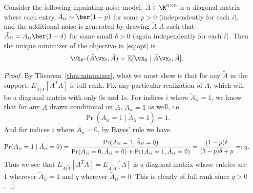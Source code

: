 \documentclass{article}
\begin{document}
\begin{corollary}\label{cor:inpainting}
    Consider the following inpainting noise model: $A \in \R^{n \times n}$ is a diagonal matrix where each entry $A_{ii} \sim \ber(1-p)$ for some $p > 0$ (independently for each $i$), and the additional noise is generated by drawing $\tilde{A}|A$ such that $\tilde{A}_{ii} = A_{ii} \ber(1-\delta)$ for some small $\delta > 0$ (again independently for each $i$). Then the unique minimizer of the objective in \eqref{eq:opt} is \begin{align*}
        \vh_{\theta^*}( \tilde{A}\vx_t, \tilde{A} ) = \mathbb{E}[ \vx_0 \mid \tilde{A}\vx_t, \tilde{A} ].
    \end{align*}
\end{corollary}
\begin{proof}%
    By Theorem~\ref{thm:minimizer}, what we must show is that for any $\tilde{A}$ in the support, $E_{A|\tilde{A}}[A^T A]$ is full-rank. Fix any particular realization of $\tilde{A}$, which will be a diagonal matrix with only $0$s and $1$s. For indices $i$ where $\tilde{A}_{ii} = 1$,  we know that for any $A$ drawn conditional on $\tilde{A}$, $A_{ii} = 1$ as well, i.e.\ \[ \Pr( A_{ii} = 1 \mid \tilde{A}_{ii} = 1 ) = 1. \] And for indices $i$ where $\tilde{A}_{ii} = 0$, by Bayes' rule we have \[ \Pr( A_{ii} = 1 \mid \tilde{A}_{ii} = 0 ) = \frac{\Pr( A_{ii} = 1 , \tilde{A}_{ii} = 0 )}{ \Pr( A_{ii} = 0 , \tilde{A}_{ii} = 0 ) + \Pr( A_{ii} = 1 , \tilde{A}_{ii} = 0 ) } \\ = \frac{(1-p) \delta }{ (1-p) \delta + p } =: q. \] Thus we see that $E_{A|\tilde{A}}[A^T A] = E_{A|\tilde{A}}[A]$ is a diagonal matrix whose entries are $1$ wherever $\tilde{A}_{ii} = 1$ and $q$ wherever $\tilde{A}_{ii} = 0$. This is clearly of full rank since $q > 0$.
\end{proof}
\end{document}
